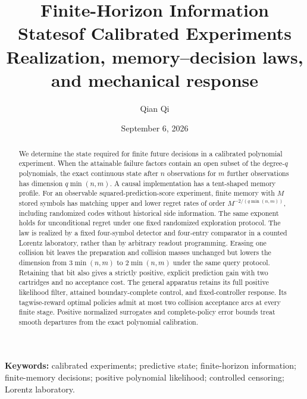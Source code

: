 \documentclass[11pt,a4paper]{article}
\title{Finite-Horizon Information States\newline of Calibrated Experiments\\[.5em]
\large Realization, memory--decision laws, and mechanical response}
\author{Qian Qi}
\date{September 6, 2026}
\theoremstyle{definition}
\theoremstyle{remark}\newtheorem{remark}[theorem]{Remark}
\begin{document}
\maketitle
\begin{abstract}
We determine the state required for finite future decisions in a calibrated
polynomial experiment. When the attainable failure factors contain an open
subset of the degree-$q$ polynomials, the exact continuous state after $n$
observations for $m$ further observations has dimension $q\min(n,m)$.
A causal implementation has a tent-shaped memory profile. For an observable
squared-prediction-score experiment, finite memory with $M$ stored symbols
has matching upper and lower regret rates of order $M^{-2/(q\min(n,m))}$,
including randomized codes without historical side information. The same
exponent holds for unconditional regret under one fixed randomized
exploration protocol. The law is
realized by a fixed four-symbol detector and four-entry comparator in a
counted Lorentz laboratory, rather than by arbitrary readout programming.
Erasing one collision bit leaves the preparation and collision masses
unchanged but lowers the dimension from $3\min(n,m)$ to $2\min(n,m)$ under
the same query protocol. Retaining that bit also gives a strictly positive,
explicit prediction gain with two cartridges and no acceptance cost.
The general apparatus retains its full positive likelihood filter, attained
boundary-complete control, and fixed-controller response. Its tagwise-reward
optimal policies admit at most two collision acceptance arcs at every finite
stage. Positive normalized surrogates and complete-policy error bounds treat
smooth departures from the exact polynomial calibration.
\end{abstract}
\noindent\textbf{Keywords:} calibrated experiments; predictive state; finite-horizon
information; finite-memory decisions; positive polynomial likelihood;
controlled censoring; Lorentz laboratory.
\clearpage
\begingroup\small\tableofcontents\endgroup
\newpage
















\end{document}
